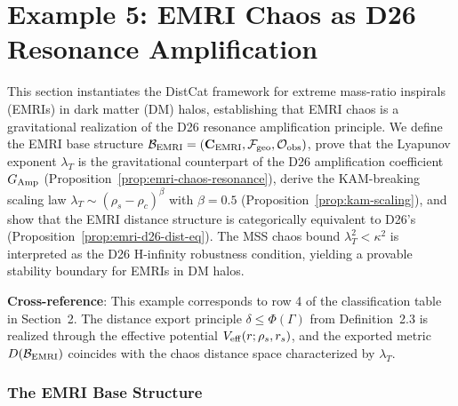 \section{Example 5: EMRI Chaos as D26 Resonance Amplification}\label{sec:example5-emri}

This section instantiates the DistCat framework for extreme mass-ratio inspirals (EMRIs) in dark matter (DM) halos, establishing that EMRI chaos is a gravitational realization of the D26 resonance amplification principle. We define the EMRI base structure $\mathcal{B}_{\rm EMRI} = (\mathbf{C}_{\rm EMRI}, \mathcal{F}_{\rm geo}, \mathcal{O}_{\rm obs})$, prove that the Lyapunov exponent $\lambda_T$ is the gravitational counterpart of the D26 amplification coefficient $G_{\rm Amp}$ (Proposition~\ref{prop:emri-chaos-resonance}), derive the KAM-breaking scaling law $\lambda_T \sim (\rho_s - \rho_c)^\beta$ with $\beta = 0.5$ (Proposition~\ref{prop:kam-scaling}), and show that the EMRI distance structure is categorically equivalent to D26's (Proposition~\ref{prop:emri-d26-dist-eq}). The MSS chaos bound $\lambda_T^2 < \kappa^2$ is interpreted as the D26 H-infinity robustness condition, yielding a provable stability boundary for EMRIs in DM halos.

\textbf{Cross-reference}: This example corresponds to row 4 of the classification table in Section~2. The distance export principle $\delta \leq \Phi(\Gamma)$ from Definition~2.3 is realized through the effective potential $V_{\rm eff}(r; \rho_s, r_s)$, and the exported metric $D(\mathcal{B}_{\rm EMRI})$ coincides with the chaos distance space characterized by $\lambda_T$.

\subsubsection{The EMRI Base Structure}\label{subsec:emri-base}

